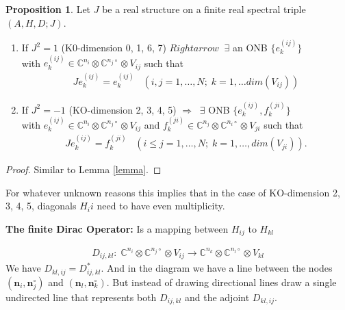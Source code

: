 \documentclass[a4paper]{article}
\theoremstyle{definition}
\theoremstyle{definition}
\theoremstyle{definition}
\theoremstyle{theorem}
\theoremstyle{theorem}
\theoremstyle{theorem}
\newtheorem{proposition}{Proposition}
\begin{document}
\begin{proposition}
    \label{proposition}
    Let $J$ be a real structure on a finite real spectral triple $(A, H , D;
    J)$.
    \begin{enumerate}
        \item If $J^2 = 1$ (K0-dimension 0, 1, 6, 7) $Rightarrow \;\; \exists$
            an ONB $\{e_k^{(ij)}\}$\\ with $e_k^{(ij)} \in \mathbb{C}^{n_i} \otimes
            \mathbb{C}^{n_j\circ} \otimes V_{ij}$ such that
            \begin{align}
                Je_k^{(ij)} = e_k^{(ij)} \;\;\; (i, j = 1,\dots,N;\; k=1,\dots
                dim(V_{ij}))
            \end{align}
        \item If $J^2 = -1$ (KO-dimension 2, 3, 4, 5) $\Rightarrow \;\; \exists$
            ONB $\{e_k^{(ij)}, f_k^{(ji)}\}$ \\
            with $e_k^{(ij)} \in \mathbb{C}^{n_i} \otimes \mathbb{C}^{n_j\circ}
            \otimes V_{ij}$ and $f_k^{(ji)} \in \mathbb{C}^{n_j} \otimes
            \mathbb{C}^{n_i\circ} \otimes V_{ji}$ such that
            \begin{align}
                Je_k^{(ij)} = f_k^{(ji)} \;\;\; (i\leq j=1,\dots, N;\;
                k=1,\dots,dim(V_{ji})).
            \end{align}
    \end{enumerate}
\end{proposition}
\begin{proof}
    Similar to Lemma \ref{lemma}.
\end{proof}

For whatever unknown reasons this implies that in the case of KO-dimension 2,
3, 4, 5, diagonals $H_ii$ need to have even multiplicity.

\textbf{The finite Dirac Operator:} Is a mapping between $H_{ij}$ to $H_{kl}$

\begin{align}
        D_{ij,kl}: \; \mathbb{C}^{n_i} \otimes
        \mathbb{C}^{n_j\circ}\otimes V_{ij} \rightarrow \mathbb{C}^{n_k} \otimes
        \mathbb{C}^{n_l\circ}\otimes V_{kl}
\end{align}
We have $D_{kl,ij} = D^*_{ij, kl}$. And in the diagram we have a line between
the nodes $(\textbf{n}_i, \textbf{n}_j^\circ)$ and $(\textbf{n}_l,
\textbf{n}_k^\circ)$. But instead of drawing directional lines draw a single
undirected line that represents both $D_{ij, kl}$ and the adjoint $D_{kl, ij}$.
\end{document}
